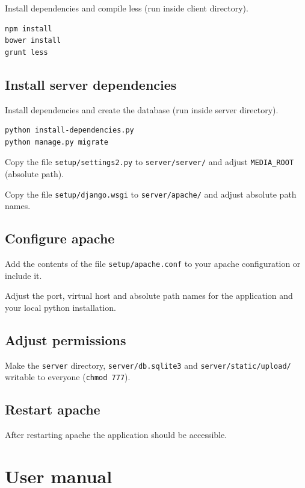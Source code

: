 Install dependencies and compile less (run inside client directory).

\begin{verbatim}
npm install
bower install
grunt less
\end{verbatim}

\subsection{Install server
dependencies}\label{install-server-dependencies}

Install dependencies and create the database (run inside server
directory).

\begin{verbatim}
python install-dependencies.py
python manage.py migrate
\end{verbatim}

Copy the file \texttt{setup/settings2.py} to \texttt{server/server/} and
adjust \texttt{MEDIA\_ROOT} (absolute path).

Copy the file \texttt{setup/django.wsgi} to \texttt{server/apache/} and
adjust absolute path names.

\subsection{Configure apache}\label{configure-apache}

Add the contents of the file \texttt{setup/apache.conf} to your apache
configuration or include it.

Adjust the port, virtual host and absolute path names for the
application and your local python installation.

\subsection{Adjust permissions}\label{adjust-permissions}

Make the \texttt{server} directory, \texttt{server/db.sqlite3} and
\texttt{server/static/upload/} writable to everyone
(\texttt{chmod\ 777}).

\subsection{Restart apache}\label{restart-apache}

After restarting apache the application should be accessible.

\newpage
\section{User manual}\label{user-manual}

